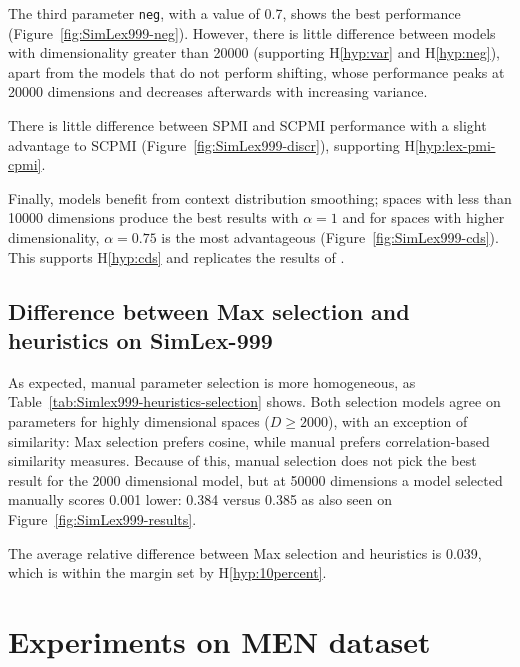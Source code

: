 
The third parameter \texttt{neg}, with a value of 0.7, shows the best performance (Figure~\ref{fig:SimLex999-neg}). However, there is little difference between models with dimensionality greater than 20000 (supporting H\ref{hyp:var} and H\ref{hyp:neg}), apart from the models that do not perform shifting, whose performance peaks at 20000 dimensions and decreases afterwards with increasing variance.

% 
There is little difference between SPMI and SCPMI performance with a slight advantage to SCPMI (Figure~\ref{fig:SimLex999-discr}), supporting H\ref{hyp:lex-pmi-cpmi}.


Finally, models benefit from context distribution smoothing; spaces with less than 10000 dimensions produce the best results with $\alpha = 1$ and for spaces with higher dimensionality, $\alpha = 0.75$ is the most advantageous (Figure~\ref{fig:SimLex999-cds}). This supports H\ref{hyp:cds} and replicates the results of .

\subsection{Difference between Max selection and heuristics on SimLex-999}

As expected, manual parameter selection is more homogeneous, as Table~\ref{tab:Simlex999-heuristics-selection} shows. Both selection models agree on parameters for highly dimensional spaces ($D \geq 2000$), with an exception of similarity: Max selection prefers cosine, while manual prefers correlation-based similarity measures. Because of this, manual selection does not pick the best result for the 2000 dimensional model, but at 50000 dimensions a model selected manually scores 0.001 lower: 0.384 versus 0.385 as also seen on Figure~\ref{fig:SimLex999-results}.
%
%
%

The average relative difference between Max selection and heuristics is 0.039, which is within the margin set by H\ref{hyp:10percent}.
%
%
%

\section{Experiments on MEN dataset}
\label{sec:men}

